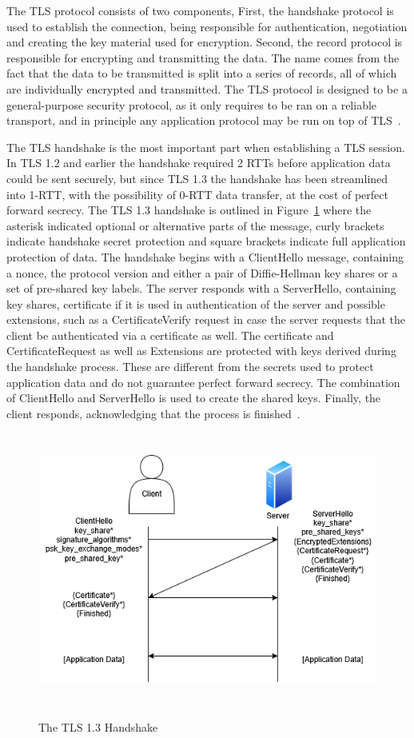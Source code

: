 \documentclass[english, 12pt, a4paper, elec, utf8, a-2b, online]{aaltothesis}
\begin{document}
The TLS protocol consists of two components, First, the handshake protocol is used to
establish the connection, being responsible for authentication, negotiation and creating
the key material used for encryption. Second, the record protocol is responsible
for encrypting and transmitting the data. The name comes from the fact that the data
to be transmitted is split into a series of records, all of which are individually
encrypted and transmitted. The TLS protocol is designed to be a general-purpose
security protocol, as it only requires to be ran on a reliable transport, and in
principle any application protocol may be run on top of TLS~\cite{rfc8446}.

The TLS handshake is the most important part when establishing a TLS session. In
TLS 1.2 and earlier the handshake required 2 RTTs before application data could be sent
securely, but since TLS 1.3 the handshake has been streamlined into 1-RTT, with the
possibility of 0-RTT data transfer, at the cost of perfect forward secrecy. The TLS 1.3
handshake is outlined in Figure~\ref{fig:tls_handshake} where the asterisk indicated optional
or alternative parts of the message, curly brackets indicate handshake secret protection and
square brackets indicate full application protection of data. The handshake begins with a ClientHello message,
containing a nonce, the protocol version and
either a pair of Diffie-Hellman key shares or a set of pre-shared key labels. The server responds
with a ServerHello, containing key shares, certificate if it is used in authentication of the server
and possible extensions, such as a CertificateVerify request in case the server requests that the client
be authenticated via a certificate as well. The certificate and CertificateRequest as
well as Extensions are protected with keys derived during the handshake process. These
are different from the secrets used to protect application data and do not guarantee
perfect forward secrecy. The combination of ClientHello and ServerHello is used to
create the shared keys. Finally, the client responds, acknowledging that the process is finished~\cite{rfc8446}.

\begin{figure}[h]
	\centering
	\includegraphics[alt={Diagram of TLS handshake between a client and a server}, height=9cm]{./images/tls_handshake.png}
	\caption{The TLS 1.3 Handshake}
	\label{fig:tls_handshake}
\end{figure}
\end{document}
